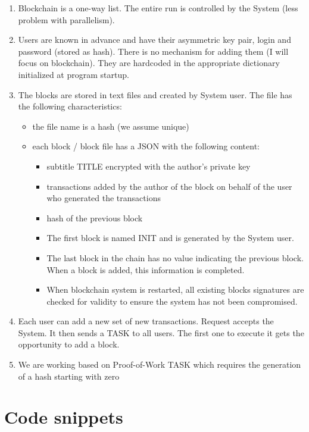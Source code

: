 \documentclass{article}
\begin{document}
\begin{enumerate}
  \item Blockchain is a one-way list. The entire run is controlled by the System (less problem with parallelism).
  \item Users are known in advance and have their asymmetric key pair, login and password (stored as hash). There is no mechanism for adding them (I will focus on blockchain). They are hardcoded in the appropriate dictionary initialized at program startup.
  \item The blocks are stored in text files and created by System user. The file has the following characteristics:
    \begin{itemize}
        \item the file name is a hash (we assume unique)
        \item each block / block file has a JSON with the following content:
        \begin{itemize}
            \item subtitle TITLE encrypted with the author's private key
            \item transactions added by the author of the block on behalf of the user who generated the transactions
            \item hash of the previous block
        \item The first block is named INIT and is generated by the System user.
	    \item The last block in the chain has no value indicating the previous block. When a block is added, this information is completed.
        \item When blockchain system is restarted, all existing blocks signatures are checked for validity to ensure the system has not been compromised.
        \end{itemize}
    \end{itemize}
    \item Each user can add a new set of new transactions. Request accepts the System. It then sends a TASK to all users. The first one to execute it gets the opportunity to add a block.
    \item We are working based on Proof-of-Work TASK which requires the generation of a hash starting with zero
\end{enumerate}


\section{Code snippets}
\end{document}

